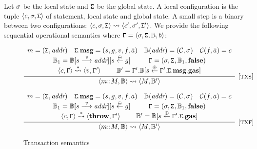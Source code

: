Let $\sigma$ be the local state and $\mathtt{\Sigma}$ be the global state. A local configuration is the tuple $\langle c,\sigma,\mathtt{\Sigma} \rangle$ of statement, local state and global state. A small step is a binary between two configurations: $\langle c,\sigma,\mathtt{\Sigma} \rangle \leadsto \langle c',\sigma',\mathtt{\Sigma}' \rangle$. We provide the following sequential operational semantics where $\mathtt{\Gamma} = \langle \sigma,\mathtt{\Sigma},\mathbb{B},b \rangle$:

\begin{figure}
$$
\infer[{[\rname{txs}]}]{\conf{m{::}M,\chain} \leadsto \conf{M,\chain'}}
{
	\begin{array}{c}
	m = (\gstate,\textit{addr})~~~\gstate.\textbf{msg} = (s,g,v,f,\bar{a})~~~ \chain(\textit{addr}) = (\mathcal{C},\lstate)~~~\mathcal{C}(f,\bar{a}) = c\\
	\chain_1 = \chain[s \stackrel{v}{\longrightarrow} \textit{addr}][s \subg g]~~~~~~~~
	\cstate = (\lstate,\gstate,\chain_1,\textbf{false})\\
	\conf{c,\cstate} \stackrel{*}{\leadsto} \conf{v,\cstate'}~~~~~~~
	\chain' = \cstate'.\chain[s \addg \cstate'.\gstate.\textbf{msg}.\textbf{gas}]
	\end{array}
}
$$

$$
\infer[{[\rname{txf}]}]{\conf{m{::}M,\chain} \leadsto \conf{M,\chain'}}
{
	\begin{array}{c}
	m = (\gstate,\textit{addr})~~~\gstate.\textbf{msg} = (s,g,v,f,\bar{a})~~~ \chain(\textit{addr}) = (\mathcal{C},\lstate)~~~\mathcal{C}(f,\bar{a}) = c\\
	\chain_1 = \chain[s \stackrel{v}{\longrightarrow} \textit{addr}][s \subg g]~~~~~~~~
	\cstate = (\lstate,\gstate,\chain_1,\textbf{false})\\
	\conf{c,\cstate} \stackrel{*}{\leadsto} \conf{\textbf{throw},\cstate'}~~~~~~~
	\chain' = \chain[s \addg \cstate'.\gstate.\textbf{gas}]
	\end{array}
}
$$
\caption{Transaction semantics}\label{fig:tx}
\end{figure}


